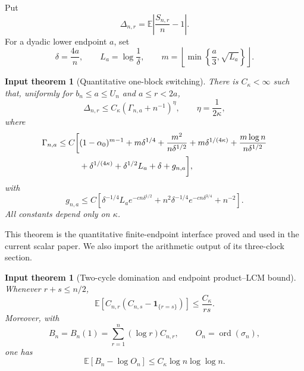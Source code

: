 \documentclass[11pt]{article}
\newtheorem{inputtheorem}[theorem]{Input theorem}
\theoremstyle{definition}
\theoremstyle{remark}
\newcommand{\Ee}{\mathbb E}
\newcommand{\one}{\mathbf 1}
\newcommand{\ord}{\operatorname{ord}}
\begin{document}
Put
\begin{equation}\label{eq:Delta}
 \Delta_{n,r}=\Ee\left|\frac{S_{n,r}}n-1\right|.
\end{equation}
For a dyadic lower endpoint $a$, set
\begin{equation}\label{eq:block-parameters}
 \delta=\frac{4a}{n},
 \qquad
 L_a=\log\frac1\delta,
 \qquad
 m=\left\lfloor\min\left\{\frac a3,\sqrt{L_a}\right\}\right\rfloor.
\end{equation}

\begin{inputtheorem}[Quantitative one-block switching]
\label{input:block}
There is $C_\kappa<\infty$ such that, uniformly for
$b_n\le a\le U_n$ and $a\le r<2a$,
\begin{equation}\label{eq:block-delta}
 \Delta_{n,r}
 \le C_\kappa(\Gamma_{n,a}+n^{-1})^{\eta},
 \qquad
 \eta=\frac1{2\kappa},
\end{equation}
where
\begin{align}
 \Gamma_{n,a}\le C\bigg[&
 (1-\alpha_0)^{m-1}
 +m\delta^{1/4}
 +\frac{m^2}{n\delta^{1/2}}
 +m\delta^{1/(4\kappa)}
 +\frac{m\log n}{n\delta^{1/2}}
 \notag\\
 &+\delta^{1/(4\kappa)}
 +\delta^{1/2}L_a
 +\delta
 +g_{n,a}\bigg],
 \label{eq:Gamma}
\end{align}
with
\begin{equation}\label{eq:g-na}
 g_{n,a}\le C\left[
 \delta^{-1/4}L_a e^{-cn\delta^{1/2}}
 +n^2\delta^{-1/4}e^{-cn\delta^{3/4}}
 +n^{-2}
 \right].
\end{equation}
All constants depend only on $\kappa$.
\end{inputtheorem}

This theorem is the quantitative finite-endpoint interface proved and used in
the current scalar paper.  We also import the arithmetic output of its
three-clock section.

\begin{inputtheorem}[Two-cycle domination and endpoint product--LCM bound]
\label{input:arithmetic}
Whenever $r+s\le n/2$,
\begin{equation}\label{eq:pair-input}
 \Ee\left[C_{n,r}(C_{n,s}-\one_{\{r=s\}})\right]
 \le\frac{C_\kappa}{rs}.
\end{equation}
Moreover, with
\[
 B_n=B_n(1)=\sum_{r=1}^n(\log r)C_{n,r},
 \qquad O_n=\ord(\sigma_n),
\]
one has
\begin{equation}\label{eq:product-lcm-input}
 \Ee[B_n-\log O_n]
 \le C_\kappa\log n\log\log n.
\end{equation}
\end{inputtheorem}
\end{document}
